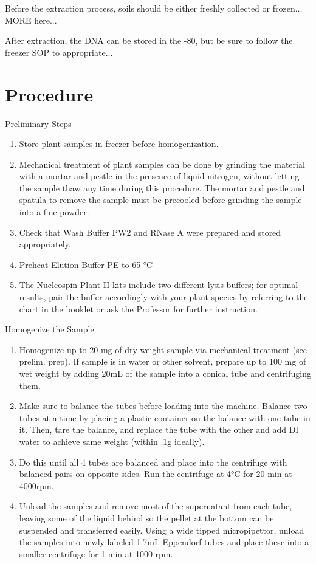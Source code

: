\documentclass[12pt]{../SOP3_alpha}
\begin{document}
\NP Before the extraction process, soils should be either freshly collected or frozen... MORE here...

\NP After extraction, the DNA can be stored in the -80, but be sure to follow the freezer SOP to appropriate...

\section{Procedure}

\NP Preliminary Steps 
\begin{enumerate}
  \item 	Store plant samples in freezer before homogenization. 
\item Mechanical treatment of plant samples can be done by grinding the material with a mortar and pestle in the presence of liquid nitrogen, without letting the sample thaw any time during this procedure. The mortar and pestle and spatula to remove the sample must be precooled before grinding the sample into a fine powder. 
\item	Check that Wash Buffer PW2 and RNase A were prepared and stored appropriately. 
\item Preheat Elution Buffer PE to 65 °C
\item The Nucleospin Plant II kits include two different lysis buffers; for optimal results, pair the buffer accordingly with your plant species by referring to the chart in the booklet or ask the Professor for further instruction. 

\end{enumerate}



\NP Homogenize the Sample
\begin{enumerate}
  \item Homogenize up to 20 mg of dry weight sample via mechanical treatment (see prelim. prep). If sample is in water or other solvent, prepare up to 100 mg of wet weight by adding 20mL of the sample into a conical tube and centrifuging them. 
  \item Make sure to balance the tubes before loading into the machine. Balance two tubes at a time by placing a plastic container on the balance with one tube in it. Then, tare the balance, and replace the tube with the other and add DI water to achieve same weight (within .1g ideally).
  \item Do this until all 4 tubes are balanced and place into the centrifuge with balanced pairs on opposite sides. Run the centrifuge at 4°C for 20 min at 4000rpm.
  \item Unload the samples and remove most of the supernatant from each tube, leaving some of the liquid behind so the pellet at the bottom can be suspended and transferred easily. Using a wide tipped micropipettor, unload the samples into newly labeled 1.7mL Eppendorf tubes and place these into a smaller centrifuge for 1 min at 1000 rpm.
\end{enumerate}
  
\end{document}
